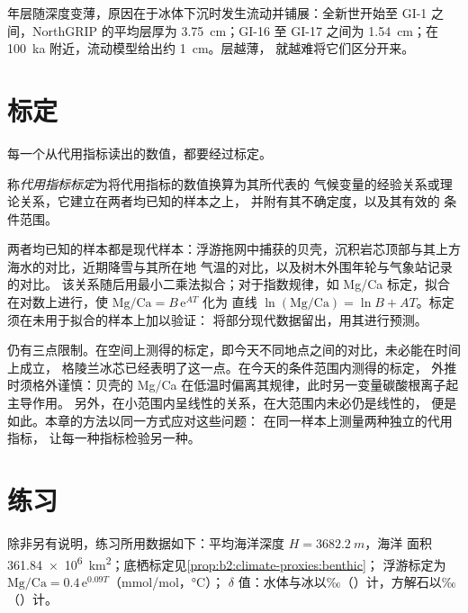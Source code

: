 年层随深度变薄，原因在于冰体下沉时发生流动并铺展：全新世开始至
GI-1 之间，NorthGRIP 的平均层厚为 \qty{3.75}{cm}；GI-16 至
GI-17 之间为 \qty{1.54}{cm}；在 \qty{100}{ka} 附近，流动模型给出约 \qty{1}{cm}。层越薄，
就越难将它们区分开来。

\section{标定}\label{sec:b2:climate-proxies:calibration}

每一个从代用指标读出的数值，都要经过标定。

\begin{definition}[代用指标标定]\label{def:b2:climate-proxies:calibration}
称\emph{代用指标标定}为将代用指标的数值换算为其所代表的
气候变量的经验关系或理论关系，它建立在两者均已知的样本之上，
并附有其不确定度，以及其有效的
条件范围。
\end{definition}

两者均已知的样本都是现代样本：浮游拖网中捕获的贝壳，沉积岩芯顶部与其上方海水的对比，近期降雪与其所在地
气温的对比，以及树木外围年轮与气象站记录的对比。
该关系随后用最小二乘法拟合；对于指数规律，如 Mg/Ca
标定，拟合在对数上进行，使 $\text{Mg/Ca} = B\,\mathrm{e}^{AT}$ 化为
直线 $\ln(\text{Mg/Ca}) = \ln B + AT$。标定须在未用于拟合的样本上加以验证：
将部分现代数据留出，用其进行预测。

仍有三点限制。在空间上测得的标定，即今天不同地点之间的对比，未必能在时间上成立，
格陵兰冰芯已经表明了这一点。在今天的条件范围内测得的标定，
外推时须格外谨慎：贝壳的 Mg/Ca 在低温时偏离其规律，此时另一变量碳酸根离子起主导作用。
另外，在小范围内呈线性的关系，在大范围内未必仍是线性的，
便是如此。本章的方法以同一方式应对这些问题：
在同一样本上测量两种独立的代用指标，
让每一种指标检验另一种。

\section*{练习}\label{sec:b2:climate-proxies:exercises}

除非另有说明，练习所用数据如下：平均海洋深度 $H = \qty{3682.2}{m}$，海洋
面积 \qty{361.84e6}{km^2}；底栖标定见\cref{prop:b2:climate-proxies:benthic}；
浮游标定为 $\text{Mg/Ca} = 0.4\,\mathrm{e}^{0.09T}$（\unit{mmol/mol}，\unit{\celsius}）；
$\delta$ 值：水体与冰以‰（）计，方解石以‰（）计。

